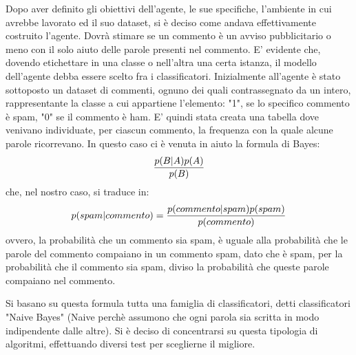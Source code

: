 \documentclass{report}
\begin{document}
    Dopo aver definito gli obiettivi dell'agente, le sue specifiche, l'ambiente in cui avrebbe lavorato ed il suo dataset, si è deciso come andava effettivamente costruito l'agente.
    Dovrà stimare se un commento è un avviso pubblicitario o meno con il solo aiuto delle parole presenti nel commento.
    E' evidente che, dovendo etichettare in una classe o nell'altra una certa istanza, il modello dell'agente debba essere scelto fra i classificatori. 
    Inizialmente all'agente è stato sottoposto 
    un dataset di commenti, ognuno dei quali contrassegnato da un intero, rappresentante la classe a cui appartiene l'elemento: "1", se lo specifico commento è spam, "0" se il commento è ham.
    E' quindi stata creata una tabella dove venivano individuate, per ciascun commento,
    la frequenza con la quale alcune parole ricorrevano. In questo caso ci è venuta in aiuto la formula di Bayes:
    \newline
    \begin{equation}\label{bho}
        { p(B|A)  p(A)\over p(B)}
    \end{equation}
    \newline
    che, nel nostro caso, si traduce in:
    \newline
    \begin{equation}\label{bho2}
        p(spam|commento) = { p(commento|spam)  p(spam)\over p(commento)}
    \end{equation}
    \newline
    ovvero, la probabilità che un commento sia spam, è uguale alla probabilità che le parole del commento compaiano in un commento spam, dato che è spam, per la probabilità 
    che il commento sia spam, diviso la probabilità che queste parole compaiano nel commento.

    Si basano su questa formula tutta una famiglia di classificatori, detti classificatori "Naive Bayes" (Naive perchè assumono che ogni parola sia scritta in modo indipendente dalle altre).
    Si è deciso di concentrarsi su questa tipologia di algoritmi, effettuando diversi test per sceglierne il migliore.
\end{document}
